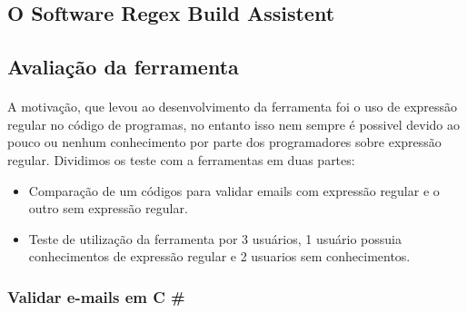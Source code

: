\documentclass[10pt,a4paper]{article}
\begin{document}
\subsection{ O Software Regex Build Assistent}

\subsection{Avaliação da ferramenta}
\paragraph{}
A motivação, que levou ao desenvolvimento da ferramenta foi o uso de expressão regular no código de programas, no entanto isso nem sempre é possivel devido ao pouco ou nenhum conhecimento por parte dos programadores sobre expressão regular. Dividimos os teste com a ferramentas em duas partes:
\begin{itemize}
\item Comparação de um códigos para validar emails com expressão regular e o outro sem expressão regular.
\item Teste de utilização da ferramenta por 3 usuários, 1 usuário possuia conhecimentos de expressão regular e 2 usuarios sem conhecimentos.
\end{itemize}
\subsubsection{Validar e-mails em C \#}
\end{document}
